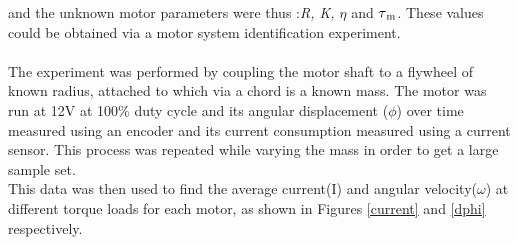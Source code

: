 \documentclass{UoNMCHA}
\numberwithin{equation}{section}
\begin{document}
and the unknown motor parameters were thus :\textit{R, K, $\eta$} and \textit{$\tau\textsubscript{m}$}. These values could be obtained via a motor system identification experiment.\\\\
The experiment was performed by coupling the motor shaft to a flywheel of known radius, attached to which via a chord is a known mass. The motor was run at 12V at 100\% duty cycle and its angular displacement ($\phi$) over time measured using an encoder and its current consumption measured using a current sensor. This process was repeated while varying the mass in order to get a large sample set.\\

This data was then used to find the average current(I) and angular velocity($\omega$) at different torque loads for each motor, as shown in Figures \ref{current} and \ref{dphi} respectively.
\end{document}
